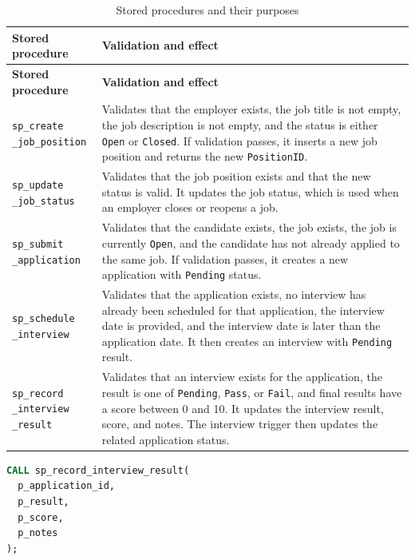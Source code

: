 \documentclass[12pt,a4paper]{report}
\makeatletter
\newcommand{\codebreak}[1]{\begin{tabular}[t]{@{}l@{}}#1\end{tabular}}
\makeatother
\begin{document}
\begin{longtable}{L{0.28\textwidth}L{0.62\textwidth}}
\caption{Stored procedures and their purposes}
\label{tab:procedures}\\
\toprule
\textbf{Stored procedure} & \textbf{Validation and effect} \\
\midrule
\endfirsthead
\toprule
\textbf{Stored procedure} & \textbf{Validation and effect} \\
\midrule
\endhead
\codebreak{\texttt{sp\_create}\\\texttt{\_job\_position}} & Validates that the employer exists, the job title is not empty, the job description is not empty, and the status is either \texttt{Open} or \texttt{Closed}. If validation passes, it inserts a new job position and returns the new \texttt{PositionID}. \\
\codebreak{\texttt{sp\_update}\\\texttt{\_job\_status}} & Validates that the job position exists and that the new status is valid. It updates the job status, which is used when an employer closes or reopens a job. \\
\codebreak{\texttt{sp\_submit}\\\texttt{\_application}} & Validates that the candidate exists, the job exists, the job is currently \texttt{Open}, and the candidate has not already applied to the same job. If validation passes, it creates a new application with \texttt{Pending} status. \\
\codebreak{\texttt{sp\_schedule}\\\texttt{\_interview}} & Validates that the application exists, no interview has already been scheduled for that application, the interview date is provided, and the interview date is later than the application date. It then creates an interview with \texttt{Pending} result. \\
\codebreak{\texttt{sp\_record}\\\texttt{\_interview}\\\texttt{\_result}} & Validates that an interview exists for the application, the result is one of \texttt{Pending}, \texttt{Pass}, or \texttt{Fail}, and final results have a score between 0 and 10. It updates the interview result, score, and notes. The interview trigger then updates the related application status. \\
\bottomrule
\end{longtable}

\begin{lstlisting}[language=SQL,caption={Example procedure style for recording an interview result}]
CALL sp_record_interview_result(
  p_application_id,
  p_result,
  p_score,
  p_notes
);
\end{lstlisting}
\end{document}
